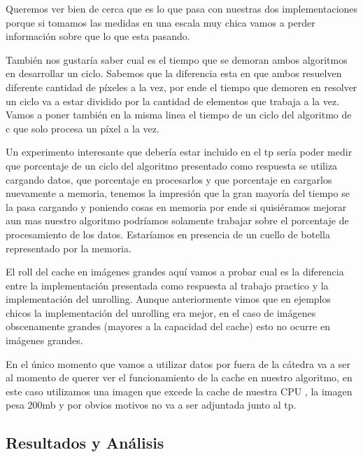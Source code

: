 Queremos ver bien de cerca que es lo que pasa con nuestras dos implementaciones porque si tomamos las medidas en una escala muy chica vamos a perder información sobre que lo que esta pasando. 

También nos gustaría saber cual es el tiempo que se demoran ambos algoritmos en desarrollar un ciclo. Sabemos que la diferencia esta en que ambos resuelven diferente cantidad de  píxeles a la vez, por ende el tiempo que demoren en resolver un ciclo va a estar dividido por la cantidad de elementos que trabaja a la vez. Vamos a poner también en la misma linea el tiempo de un ciclo del algoritmo de c que solo procesa un píxel a la vez.

Un experimento interesante que debería estar incluido en el tp sería poder medir que porcentaje de un ciclo del algoritmo presentado como respuesta se utiliza cargando datos, que porcentaje en procesarlos y que porcentaje en cargarlos nuevamente a memoria, tenemos la impresión que la gran mayoría del tiempo se la pasa cargando y poniendo cosas en memoria por ende si quisiéramos mejorar aun mas nuestro algoritmo podríamos solamente trabajar sobre el porcentaje de procesamiento de los datos. Estaríamos en presencia de un cuello de botella representado por la memoria.

El roll del cache en imágenes grandes aquí vamos a probar cual es la diferencia entre la implementación presentada como respuesta al trabajo practico y la implementación del unrolling. Aunque anteriormente vimos que en ejemplos chicos la implementación del unrolling era mejor, en el caso de imágenes obscenamente grandes (mayores a la capacidad del cache) esto no ocurre en imágenes grandes.

En el único momento que vamos a utilizar datos por fuera de la cátedra va a ser al momento de querer ver el funcionamiento de la cache en nuestro algoritmo, en este caso utilizamos una imagen que excede la cache de nuestra CPU , la imagen pesa 200mb y por obvios motivos no va a ser adjuntada junto al tp.

\subsection{Resultados y Análisis}

